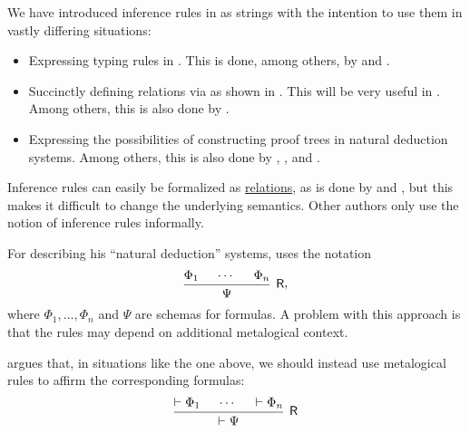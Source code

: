 \begin{remark}\label{rem:inference_rules_semantics}
  We have introduced inference rules in  as strings with the intention to use them in vastly differing situations:
  \begin{itemize}
    \item Expressing typing rules in . This is done, among others, by  and .
    \item Succinctly defining relations via  as shown in . This will be very useful in . Among others, this is also done by .
    \item Expressing the possibilities of constructing proof trees in natural deduction systems. Among others, this is also done by , ,  and .
  \end{itemize}

  Inference rules can easily be formalized as \hyperref[def:relation]{relations}, as is done by  and , but this makes it difficult to change the underlying semantics. Other authors only use the notion of inference rules informally.

  For describing his \enquote{natural deduction} systems,  uses the notation
  \begin{equation*}
    \begin{prooftree}
      \hypo{ \Phi_1 }
      \hypo{ \cdots }
      \hypo{ \Phi_n }
      \infer3[\logic{R}]{ \Psi }
    \end{prooftree},
  \end{equation*}
  where \( \Phi_1, \ldots, \Phi_n \) and \( \Psi \) are schemas for formulas. A problem with this approach is that the rules may depend on additional metalogical context.

   argues that, in situations like the one above, we should instead use metalogical rules to affirm the corresponding formulas:
  \begin{equation*}
    \begin{prooftree}
      \hypo{ \vdash \Phi_1 }
      \hypo{ \cdots }
      \hypo{ \vdash \Phi_n }
      \infer3[\logic{R}]{ \vdash \Psi }
    \end{prooftree}
  \end{equation*}


\end{remark}
